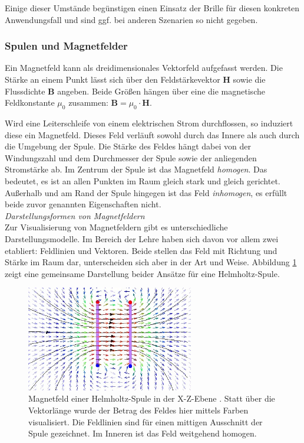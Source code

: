 Einige dieser Umstände begünstigen einen Einsatz der Brille für diesen konkreten Anwendungsfall und sind ggf. bei anderen Szenarien so nicht gegeben.\\

\subsubsection{Spulen und Magnetfelder}
\label{sec-2-3-2}
Ein Magnetfeld kann als dreidimensionales Vektorfeld aufgefasst werden. Die Stärke an einem Punkt lässt sich über den Feldstärkevektor $\boldsymbol{H}$ sowie die Flussdichte $\boldsymbol{B}$ angeben. Beide Größen hängen über eine die magnetische Feldkonstante $\mu_{0}$ zusammen: $\boldsymbol{B} = \mu_{0} \cdot \boldsymbol{H}$.
\par
\noindent\hspace*{5mm}
Wird eine Leiterschleife von einem elektrischen Strom durchflossen, so induziert diese ein Magnetfeld. Dieses Feld verläuft sowohl durch das Innere als auch durch die Umgebung der Spule. Die Stärke des Feldes hängt dabei von der Windungszahl und dem Durchmesser der Spule sowie der anliegenden Stromstärke ab.
Im Zentrum der Spule ist das Magnetfeld \textit{homogen}. Das bedeutet, es ist an allen Punkten im Raum gleich stark und gleich gerichtet. Außerhalb und am Rand der Spule hingegen ist das Feld \textit{inhomogen}, es erfüllt beide zuvor genannten Eigenschaften nicht.\\

\textit{Darstellungsformen von Magnetfeldern}\\
Zur Visualisierung von Magnetfeldern gibt es unterschiedliche Darstellungsmodelle. Im Bereich der Lehre haben sich davon vor allem zwei etabliert: Feldlinien und Vektoren. Beide stellen das Feld mit Richtung und Stärke im Raum dar, unterscheiden sich aber in der Art und Weise. Abbildung \ref{img:Magnetfeld-Helmholtzspule} zeigt eine gemeinsame Darstellung beider Ansätze für eine Helmholtz-Spule.\\

\begin{figure}[h!]
	\centering
	\includegraphics[width=0.65\textwidth]{images/papers/Magnetfeld-Helmholtzspule.jpg}
	\caption{Magnetfeld einer Helmholtz-Spule in der X-Z-Ebene \cite{wiki:15}. Statt über die Vektorlänge wurde der Betrag des Feldes hier mittels Farben visualisiert. Die Feldlinien sind für einen mittigen Ausschnitt der Spule gezeichnet. Im Inneren ist das Feld weitgehend homogen.} %
	\label{img:Magnetfeld-Helmholtzspule}
\end{figure}


